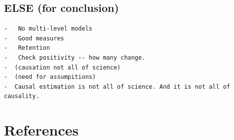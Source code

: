 \documentclass[
  singlecolumn]{report}
\begin{document}
\hypertarget{else-for-conclusion}{%
\subsection{ELSE (for conclusion)}\label{else-for-conclusion}}

\begin{verbatim}
-   No multi-level models
-   Good measures
-   Retention
-   Check positivity -- how many change.
-  (causation not all of science)
-  (need for assumpitions)
-  Causal estimation is not all of science. And it is not all of causality.
\end{verbatim}

\hypertarget{references}{%
\section*{References}\label{references}}
\end{document}
